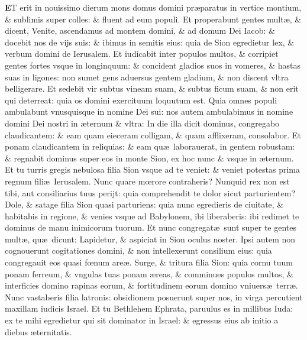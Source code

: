 \documentclass[a5paper,10pt]{book}
\def\leftmarginnote{%
	\lrmarginnote{\hskip -\marginparsep \hskip -6.5em}}
\def\ae{æ}
\def\oe{œ}
\begin{document}
\begin{multicols*}{2}
\lettrine[lines=2]{\bfseries E}{}T\leftmarginnote{\begin{flushright}ca. 4.\end{flushright}} erit in nouissimo dierum mons domus domini pr\ae paratus in vertice montium, \& sublimis super colles: \& fluent ad eum populi.
Et properabunt gentes mult\ae , \& dicent, Venite, ascendamus ad montem domini, \& ad domum Dei Iacob: \& docebit nos de vijs suis: \& ibimus in semitis eius: quia de Sion egredietur lex, \& verbum domini de Ierusalem.
Et iudicabit inter populos multos, \& corripiet gentes fortes vsque in longinquum: \& concident gladios suos in vomeres, \& hastas suas in ligones: non sumet gens aduersus gentem gladium, \& non discent vltra belligerare.
Et sedebit vir subtus vineam suam, \& subtus ficum suam, \& non erit qui deterreat: quia os domini exercituum loquutum est.
Quia omnes populi ambulabunt vnusquisque in nomine Dei sui: nos autem ambulabimus in nomine domini Dei nostri in \ae ternum \& vltra: In die illa dicit dominus, congregabo claudicantem: \& eam quam eieceram colligam, \& quam afflixeram, consolabor.
Et ponam claudicantem in reliquias: \& eam qu\ae \ laborauerat, in gentem robustam: \& regnabit dominus super eos in monte Sion, ex hoc nunc \& vsque in \ae ternum.
Et tu turris gregis nebulosa filia Sion vsque ad te veniet: \& veniet potestas
prima regnum fili\ae \ Ierusalem.
Nunc quare m\oe rore contraheris? Nunquid rex non est tibi, aut consiliarius tuus perijt: quia comprehendit te dolor sicut parturientem?
Dole, \& satage filia Sion quasi parturiens: quia nunc egredieris de ciuitate, \& habitabis in regione, \& venies vsque ad Babylonem, ibi liberaberis: ibi redimet te dominus de manu inimicorum tuorum.
Et nunc congregat\ae \ sunt super te gentes mult\ae , qu\ae \ dicunt: Lapidetur, \& aspiciat in Sion oculus noster.
Ipsi autem non cognouerunt cogitationes domini, \& non intellexerunt consilium eius: quia congregauit eos quasi f\oe num are\ae .
Surge, \& tritura filia Sion: quia cornu tuum ponam ferreum, \& vngulas tuas ponam \ae reas, \& comminues populos multos, \& interficies domino rapinas eorum, \& fortitudinem eorum domino vniuers\ae \ terr\ae .
\newline \indent Nunc\leftmarginnote{\begin{flushright}ca. 5.\end{flushright}} vastaberis filia latronis: obsidionem posuerunt super nos, in virga percutient maxillam iudicis Israel.
Et tu Bethlehem Ephrata, paruulus es in millibus Iuda: ex te mihi egredietur qui sit dominator in Israel: \& egressus eius ab initio a diebus \ae ternitatis.

\end{multicols*}
\end{document}
